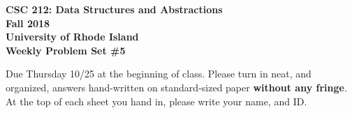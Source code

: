 \documentclass[11pt]{article}
\begin{document}
    \thispagestyle{empty}
    
    \begin{center}
        {\Large\bf CSC 212: Data Structures and Abstractions}\\
        \medskip
        {\Large\bf Fall 2018}\\
        \medskip
        {\Large\bf University of Rhode Island}\\
        \bigskip
        {\Large\bf Weekly Problem Set \#5}
    \end{center}
    
    Due Thursday 10/25 at the beginning of class. Please turn in neat, and organized, answers hand-written on standard-sized paper \textbf{without any fringe}. At the top of each sheet you hand in, please write your name, and ID.
    
\end{document}
